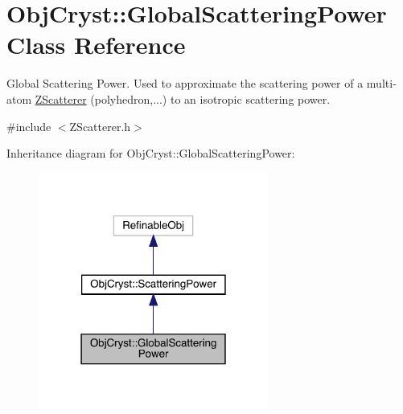 \hypertarget{class_obj_cryst_1_1_global_scattering_power}{}\section{Obj\+Cryst\+::Global\+Scattering\+Power Class Reference}
\label{class_obj_cryst_1_1_global_scattering_power}


Global Scattering Power. Used to approximate the scattering power of a multi-\/atom \mbox{\hyperlink{class_obj_cryst_1_1_z_scatterer}{Z\+Scatterer}} (polyhedron,...) to an isotropic scattering power.  




{\ttfamily \#include $<$Z\+Scatterer.\+h$>$}



Inheritance diagram for Obj\+Cryst\+::Global\+Scattering\+Power\+:
\nopagebreak
\begin{figure}[H]
\begin{center}
\leavevmode
\includegraphics[width=214pt]{class_obj_cryst_1_1_global_scattering_power__inherit__graph}
\end{center}
\end{figure}


